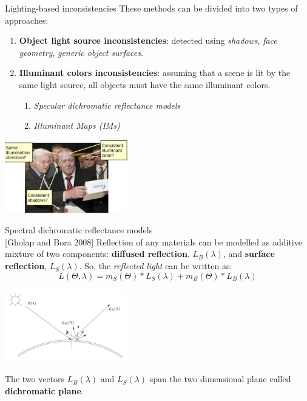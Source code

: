 \begin{tframe}{Lighting-based inconsistencies}
\vspace{0.1cm}
These methods can be divided into two types of approaches:
\vspace{0.2cm}
\begin{enumerate}
\item \textbf{Object light source inconsistencies}: detected using \emph{shadows}, \emph{face geometry}, \emph{generic object surfaces}.
\vspace{0.2cm}

\item \textbf{Illuminant colors inconsistencies}: {\small assuming that a scene is lit by the same light source, all objects must have the same illuminant colors.}
\vspace{0.2cm}
\begin{enumerate}
\item \textit{Specular dichromatic reflectance models}
\vspace{0.1cm}
\item \textit{Illuminant Maps (IMs)}
\end{enumerate}
\end{enumerate}
\begin{center}
\includegraphics[width=0.4\textwidth]{images/lighting-based.jpg}
\end{center}
\end{tframe}

\begin{tframe}{Spectral dichromatic reflectance models\\{\small [Gholap and Bora 2008]}}
\vspace{0.1cm}
Reflection of any materials can be modelled as additive mixture of two components: \textbf{diffused reflection}. $L_B(\lambda)$, and \textbf{surface reflection}, $L_S(\lambda)$. So, the \emph{reflected light} can be written as:
$$L(\Theta, \lambda) = m_S(\Theta)* L_S(\lambda) + m_B(\Theta) * L_B(\lambda)$$

\begin{center}
\includegraphics[width=0.4\textwidth]{images/reflectance.jpg}
\end{center}

The two vectors $L_B(\lambda)$ and $L_S(\lambda)$ span the two dimensional plane called \textbf{dichromatic plane}.
\end{tframe}


